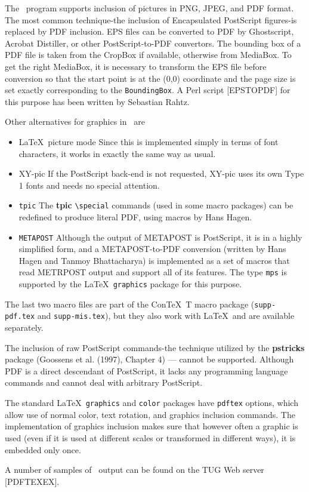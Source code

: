 
The \pdfTEX\  program supports inclusion of pictures in PNG, JPEG, and
PDF format. The most common technique-the inclusion of Encapsulated
PostScript figures-is replaced by PDF inclusion. EPS files can be
converted to PDF by Ghostscript, Acrobat Distiller, or other
PostScript-to-PDF convertors. The bounding box of a PDF file is taken
from the CropBox if available, otherwise from MediaBox. To get the right
MediaBox, it is necessary to transform the EPS file before conversion so
that the start point is at the (0,0) coordinate and the page size 
is set exactly corresponding to the \verb|BoundingBox|. A Perl script [EPSTOPDF] for 
this purpose has been written by Sebastian Rahtz. 

Other alternatives for graphics in \pdfTEX\  are 

\begin{itemize}
  \item \LaTeX\  picture mode Since this is implemented simply in terms of font characters, it works in exactly the same way as usual. 
  \item XY-pic If the PostScript back-end is not requested, XY-pic uses its own Type 1 
    fonts and needs no special attention. 
  \item \verb|tpic| The \textbf{tpic} \verb|\special| commands (used in some macro packages) can be 
    redefined to produce literal PDF, using macros by Hans Hagen. 
  \item \verb|METAPOST| Although the output of METAPOST is PostScript, it is in a 
    highly simplified form, and a METAPOST-to-PDF conversion (written by Hans 
    Hagen and Tanmoy Bhattacharya) is implemented as a set of macros that read 
    METRPOST output and support all of its features. The type \verb|mps| is supported 
    by the \LaTeX\  \verb|graphics| package for this purpose. 
\end{itemize}

The last two macro files are part of the Con\TeX\ T macro package (\verb|supp-pdf.tex| 
and \verb|supp-mis.tex|), but they also work with \LaTeX\ and are available separately. 

The inclusion of raw PostScript commands-the technique utilized by the
\textbf{pstricks} package (Goossens et al. (1997), Chapter 4) --- cannot be
supported.  Although PDF is a direct descendant of PostScript, it lacks
any programming language commands and cannot deal with arbitrary
PostScript. 

The standard \LaTeX\  \verb|graphics| and \verb|color| packages have
\verb|pdftex| options, which allow use of normal color, text rotation,
and graphics inclusion commands.  The implementation of graphics
inclusion makes sure that however often a graphic is used (even if it is
used at different scales or transformed in different ways), it is
embedded only once. 

A number of samples of \pdfTEX\  output can be found on the TUG Web server 
[PDFTEXEX]. 
